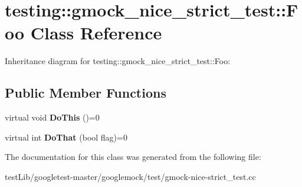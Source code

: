 \hypertarget{classtesting_1_1gmock__nice__strict__test_1_1Foo}{}\section{testing\+:\+:gmock\+\_\+nice\+\_\+strict\+\_\+test\+:\+:Foo Class Reference}
\label{classtesting_1_1gmock__nice__strict__test_1_1Foo}


Inheritance diagram for testing\+:\+:gmock\+\_\+nice\+\_\+strict\+\_\+test\+:\+:Foo\+:
\subsection*{Public Member Functions}
\begin{DoxyCompactItemize}
\item 
\mbox{\label{classtesting_1_1gmock__nice__strict__test_1_1Foo_a79a3cdbd8d9d9f6bc87580563b0d7cec}} 
virtual void {\bfseries Do\+This} ()=0
\item 
\mbox{\label{classtesting_1_1gmock__nice__strict__test_1_1Foo_a8527a459b03f333a809a3376311a9f8b}} 
virtual int {\bfseries Do\+That} (bool flag)=0
\end{DoxyCompactItemize}


The documentation for this class was generated from the following file\+:\begin{DoxyCompactItemize}
\item 
test\+Lib/googletest-\/master/googlemock/test/gmock-\/nice-\/strict\+\_\+test.\+cc\end{DoxyCompactItemize}
